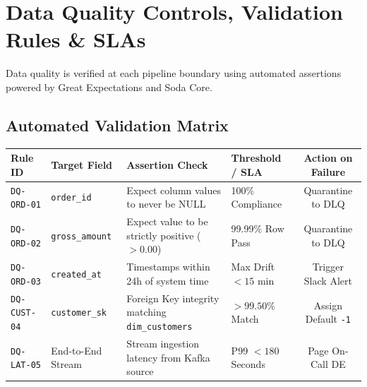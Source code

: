 \documentclass[10pt, a4paper]{article}
\begin{document}
\section{Data Quality Controls, Validation Rules \& SLAs}

Data quality is verified at each pipeline boundary using automated assertions powered by Great Expectations and Soda Core.

\subsection{Automated Validation Matrix}
\vspace{2pt}

\scriptsize
\begin{tabularx}{\textwidth}{@{}l l L L c@{}}
\toprule
{}
\textbf{Rule ID} & \textbf{Target Field} & \textbf{Assertion Check} & \textbf{Threshold / SLA} & \textbf{Action on Failure} \\
\midrule
\texttt{DQ-ORD-01} & \texttt{order\_id} & Expect column values to never be NULL & 100\% Compliance & Quarantine to DLQ \\
\texttt{DQ-ORD-02} & \texttt{gross\_amount} & Expect value to be strictly positive ($> 0.00$) & 99.99\% Row Pass & Quarantine to DLQ \\
\texttt{DQ-ORD-03} & \texttt{created\_at} & Timestamps within 24h of system time & Max Drift $< 15$ min & Trigger Slack Alert \\
\texttt{DQ-CUST-04} & \texttt{customer\_sk} & Foreign Key integrity matching \texttt{dim\_customers} & $> 99.50\%$ Match & Assign Default \texttt{-1} \\
\texttt{DQ-LAT-05} & End-to-End Stream & Stream ingestion latency from Kafka source & P99 $< 180$ Seconds & Page On-Call DE \\
\bottomrule
\end{tabularx}

\vspace{4pt}
\end{document}
